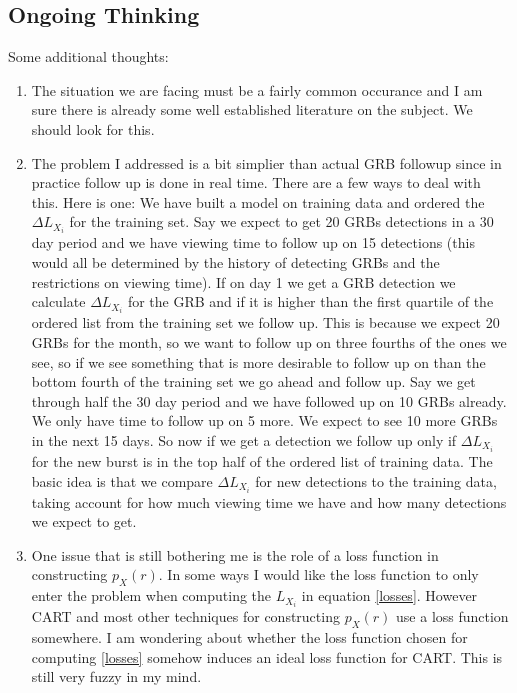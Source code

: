 \documentclass[10pt]{article}
\begin{document}
\subsection{Ongoing Thinking}
Some additional thoughts:
\begin{enumerate}
\item The situation we are facing must be a fairly common occurance and I am sure there is already some well established literature on the subject. We should look for this.
\item The problem I addressed is a bit simplier than actual GRB followup since in practice follow up is done in real time. There are a few ways to deal with this. Here is one: We have built a model on training data and ordered the $\Delta L_{X_i}$ for the training set. Say we expect to get 20 GRBs detections in a 30 day period and we have viewing time to follow up on 15 detections (this would all be determined by the history of detecting GRBs and the restrictions on viewing time). If on day 1 we get a GRB detection we calculate  $\Delta L_{X_i}$ for the GRB and if it is higher than the first quartile of the ordered list from the training set we follow up. This is because we expect 20 GRBs for the month, so we want to follow up on three fourths of the ones we see, so if we see something that is more desirable to follow up on than the bottom fourth of the training set we go ahead and follow up. Say we get through half the 30 day period and we have followed up on 10 GRBs already. We only have time to follow up on 5 more. We expect to see 10 more GRBs in the next 15 days. So now if we get a detection we follow up only if $\Delta L_{X_i}$ for the new burst is in the top half of the ordered list of training data. The basic idea is that we compare $\Delta L_{X_i}$ for new detections to the training data, taking account for how much viewing time we have and how many detections we expect to get.
\item One issue that is still bothering me is the role of a loss function in constructing $p_{X}(r)$. In some ways I would like the loss function to only enter the problem when computing the $L_{X_i}$ in equation \eqref{losses}. However CART and most other techniques for constructing $p_{X}(r)$ use a loss function somewhere. I am wondering about whether the loss function chosen for computing \eqref{losses} somehow induces an ideal loss function for CART. This is still very fuzzy in my mind.
\end{enumerate}
\end{document}
